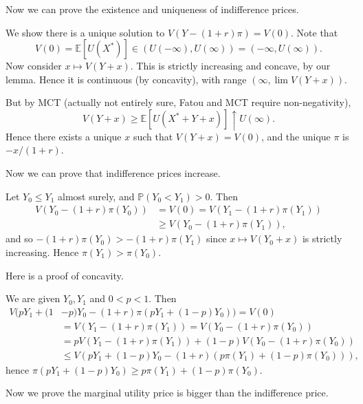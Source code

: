 \documentclass[12pt]{article}
\begin{document}
Now we can prove the existence and uniqueness of indifference prices.

\begin{proofbox}
	We show there is a unique solution to $V(Y - (1+r)\pi) = V(0)$. Note that
	\[
	V(0) = \mathbb{E}[U(X^{\ast})] \in (U(-\infty), U(\infty)) = (-\infty, U(\infty)).
	\]
	Now consider $x \mapsto V(Y + x)$. This is strictly increasing and concave, by our lemma. Hence it is continuous (by concavity), with range $(\infty, \lim V(Y+x))$.

	But by MCT (actually not entirely sure, Fatou and MCT require non-negativity),
	\[
	V(Y + x) \geq \mathbb{E}[U(X^\ast + Y + x)] \uparrow U(\infty).
	\]
	Hence there exists a unique $x$ such that $V(Y + x) = V(0)$, and the unique $\pi$ is $-x/(1+r)$.
\end{proofbox}

Now we can prove that indifference prices increase.

\begin{proofbox}
	Let $Y_0 \leq Y_1$ almost surely, and $\mathbb{P}(Y_0 < Y_1) > 0$. Then
	\begin{align*}
		V(Y_0 - (1+r)\pi(Y_0)) &= V(0) = V(Y_1 - (1+r) \pi(Y_1)) \\
				       & \geq V(Y_0 - (1+r)\pi(Y_1)),
	\end{align*}
	and so $-(1+r)\pi(Y_0) > -(1+r)\pi(Y_1)$ since $x \mapsto V(Y_0 + x)$ is strictly increasing. Hence $\pi(Y_1) > \pi(Y_0)$.
\end{proofbox}

Here is a proof of concavity.

\begin{proofbox}
	We are given $Y_0, Y_1$ and $0 < p < 1$. Then
	\begin{align*}
		V(pY_1 + (1&-p)Y_0 - (1+r)\pi(pY_1 + (1-p)Y_0)) = V(0) \\
				    &= V(Y_1 - (1+r)\pi(Y_1)) = V(Y_0 - (1+r)\pi(Y_0)) \\
							       &= p V(Y_1 - (1+r)\pi(Y_1)) + (1-p) V(Y_0 - (1+r)\pi(Y_0)) \\
							       &\leq V(pY_1 + (1-p)Y_0 - (1+r)(p \pi(Y_1) + (1-p) \pi(Y_0))),
	\end{align*}
	hence $\pi(pY_1 + (1-p)Y_0) \geq p\pi(Y_1) + (1-p)\pi(Y_0)$.
\end{proofbox}

Now we prove the marginal utility price is bigger than the indifference price.
\end{document}
